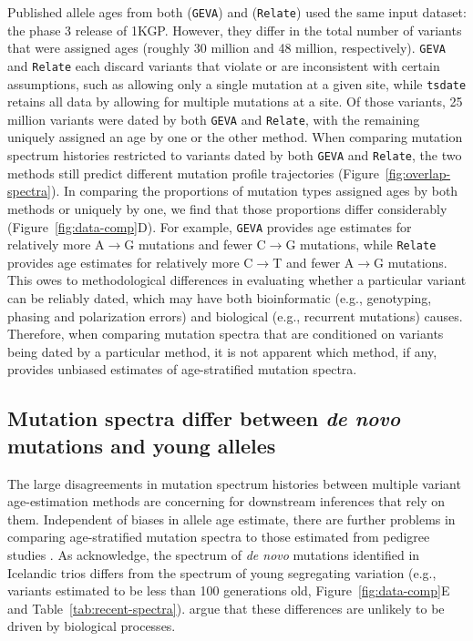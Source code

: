 \documentclass[]{article}
\newcommand{\GEVA}{\texttt{GEVA}\xspace}
\newcommand{\tsdate}{\texttt{tsdate}\xspace}
\newcommand{\relate}{\texttt{Relate}\xspace}
\begin{document}
Published allele ages from both \citet{albers2020dating} (\GEVA) and
\citet{speidel2019method} (\relate) used the same input dataset: the phase 3
release of 1KGP. However, they differ in the total number of variants that were
assigned ages (roughly 30 million and 48 million, respectively). \GEVA and
\relate each discard variants that violate or are inconsistent with certain
assumptions, such as allowing only a single mutation at a given site,
while \tsdate retains all data by allowing for multiple mutations at a site.
Of those variants, 25 million variants were dated by both \GEVA and \relate,
with the remaining uniquely
assigned an age by one or the other method. When comparing mutation spectrum
histories restricted to variants dated by both \GEVA and \relate, the two
methods still predict different mutation profile trajectories
(Figure~\ref{fig:overlap-spectra}). In comparing the proportions of mutation
types assigned ages by both methods or uniquely by one, we find that those
proportions differ considerably (Figure~\ref{fig:data-comp}D). For example,
\GEVA provides age estimates for relatively more A$\rightarrow$G mutations and
fewer C$\rightarrow$G mutations, while \relate provides age estimates for
relatively more C$\rightarrow$T and fewer A$\rightarrow$G mutations. This owes
to methodological differences in evaluating whether a particular variant can be
reliably dated, which may have both bioinformatic (e.g., genotyping, phasing
and polarization errors) and biological (e.g., recurrent mutations) causes.
Therefore, when comparing mutation spectra that are conditioned on variants
being dated by a particular method, it is not apparent which method, if any,
provides unbiased estimates of age-stratified mutation spectra.

\subsection*{Mutation spectra differ between \emph{de novo} mutations and young
alleles}

The large disagreements in mutation spectrum histories between multiple variant
age-estimation methods are concerning for downstream inferences that rely on
them. Independent of biases in allele age estimate, there are further problems
in comparing age-stratified mutation spectra to those estimated from pedigree
studies \citep{jonsson2017parental,halldorsson2019characterizing}. As
\citet{wang2023human} acknowledge, the spectrum of \emph{de novo} mutations
identified in Icelandic trios \citep{jonsson2017parental} differs from the
spectrum of young segregating variation (e.g., variants estimated to be less
than 100 generations old, Figure~\ref{fig:data-comp}E and
Table~\ref{tab:recent-spectra}). \citet{gao2023limited} argue that these
differences are unlikely to be driven by biological processes.
\end{document}
